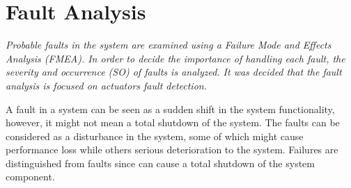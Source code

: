 \chapter{Fault  Analysis }
\textit{Probable faults in the system are examined using a  Failure Mode and Effects Analysis (FMEA). In order to decide the importance of handling each fault, the severity and occurrence (SO)  of faults is analyzed. It was decided that the fault analysis is focused on actuators fault detection.}


A fault in a system can be seen as a sudden shift in the system functionality, however, it might not mean a total shutdown of the system. The faults can be considered as a disturbance in the system, some of which might cause performance loss while others serious deterioration to the system. Failures are distinguished from faults since can cause a total shutdown of the system component. 

